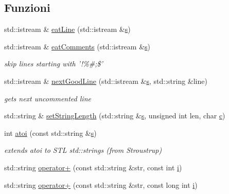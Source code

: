 \subsection*{Funzioni}
\begin{DoxyCompactItemize}
\item 
std\-::istream \& \hyperlink{namespaceLifeV_aa91d4c3fafd93fcbfb7d0aca2b771a02}{eat\-Line} (std\-::istream \&\hyperlink{god__e_8m_aaa7c61c7163e7fc36352afb33ce6c3dd}{s})
\item 
std\-::istream \& \hyperlink{namespaceLifeV_aecf5099a32c6f096d09d0506ee79255b}{eat\-Comments} (std\-::istream \&\hyperlink{god__e_8m_aaa7c61c7163e7fc36352afb33ce6c3dd}{s})
\begin{DoxyCompactList}\small\item\em skip lines starting with '!\%\#;\$' \end{DoxyCompactList}\item 
std\-::istream \& \hyperlink{namespaceLifeV_a2c4dd8a300964aa48909fce6ad5c72f5}{next\-Good\-Line} (std\-::istream \&\hyperlink{god__e_8m_aaa7c61c7163e7fc36352afb33ce6c3dd}{s}, std\-::string \&line)
\begin{DoxyCompactList}\small\item\em gets next uncommented line \end{DoxyCompactList}\item 
std\-::string \& \hyperlink{namespaceLifeV_a5fb0107fd71b5be2c32f536619a73175}{set\-String\-Length} (std\-::string \&\hyperlink{god__e_8m_aaa7c61c7163e7fc36352afb33ce6c3dd}{s}, unsigned int len, char \hyperlink{lineare_8m_ae0323a9039add2978bf5b49550572c7c}{c})
\item 
int \hyperlink{namespaceLifeV_a1a787279805886c5b208055992c29c9a}{atoi} (const std\-::string \&\hyperlink{god__e_8m_aaa7c61c7163e7fc36352afb33ce6c3dd}{s})
\begin{DoxyCompactList}\small\item\em extends atoi to S\-T\-L std\-::strings (from Stroustrup) \end{DoxyCompactList}\item 
std\-::string \hyperlink{namespaceLifeV_af57500c586141320ace55cf0b2a5c9fe}{operator+} (const std\-::string \&str, const int \hyperlink{god__e_8m_a8604be5925f4266ab5ccc69675329c80}{i})
\item 
std\-::string \hyperlink{namespaceLifeV_ae00b5ce86e0f837f3f3392074652b7ed}{operator+} (const std\-::string \&str, const long int \hyperlink{god__e_8m_a8604be5925f4266ab5ccc69675329c80}{i})
\item 

\end{DoxyCompactItemize}
